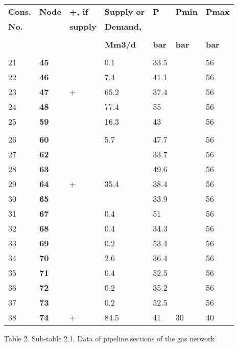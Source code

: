 \documentclass{article}
\begin{document}
\begin{tabular}{lllllll}
\textbf{Cons.} & \textbf{Node} & \textbf{+, if} & \textbf{Supply or } & 
\textbf{P} & \textbf{Pmin} & \textbf{Pmax} \\ 
\textbf{No.} &  & \textbf{supply} & \textbf{Demand,} &  &  &  \\ 
&  &  &  &  &  &  \\ 
&  &  & \textbf{Mm3/d} & \textbf{bar} & \textbf{bar} & \textbf{bar} \\ 
&  &  &  &  &  &  \\ 
21 & \textbf{45} &  & 0.1 & 33.5 &  & 56 \\ 
22 & \textbf{46} &  & 7.4 & 41.1 &  & 56 \\ 
23 & \textbf{47} & + & 65.2 & 37.4 &  & 56 \\ 
24 & \textbf{48} &  & 77.4 & 55 &  & 56 \\ 
25 & \textbf{59} &  & 16.3 & 43 &  & 56 \\ 
&  &  &  &  &  &  \\ 
26 & \textbf{60} &  & 5.7 & 47.7 &  & 56 \\ 
27 & \textbf{62} &  &  & 33.7 &  & 56 \\ 
28 & \textbf{63} &  &  & 49.6 &  & 56 \\ 
29 & \textbf{64} & + & 35.4 & 38.4 &  & 56 \\ 
30 & \textbf{65} &  &  & 33.9 &  & 56 \\ 
31 & \textbf{67} &  & 0.4 & 51 &  & 56 \\ 
32 & \textbf{68} &  & 0.4 & 34.3 &  & 56 \\ 
33 & \textbf{69} &  & 0.2 & 53.4 &  & 56 \\ 
34 & \textbf{70} &  & 2.6 & 36.4 &  & 56 \\ 
35 & \textbf{71} &  & 0.4 & 52.5 &  & 56 \\ 
36 & \textbf{72} &  & 0.2 & 35.2 &  & 56 \\ 
37 & \textbf{73} &  & 0.2 & 52.5 &  & 56 \\ 
38 & \textbf{74} & + & 84.5 & 41 & 30 & 40\end{tabular}

\bigskip


\bigskip

\newpage

\bigskip

Table 2. Sub-table 2.1. Data of pipeline sections of the gas network

\bigskip
\end{document}
